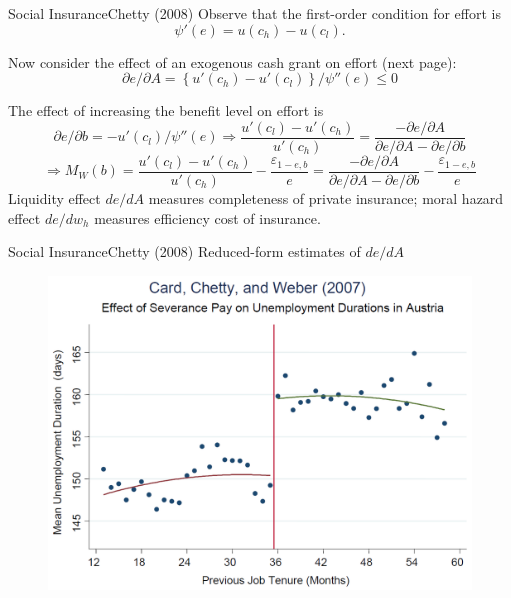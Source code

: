 \documentclass{beamer}
\begin{document}
\begin{frame}{Social Insurance}{Chetty (2008)}
	Observe that the first-order condition for effort is \hyperlink{eq26}{}
	\begin{equation}
		\psi'(e) = u(c_h) - u(c_l).
	\end{equation}

	Now consider the effect of an exogenous cash grant on effort (next page):
	\begin{equation}
		\partial e/\partial A = \left\{u'(c_h)-u'(c_l)\right\}/\psi''(e) \leq 0
	\end{equation}

	The effect of increasing the benefit level on effort is
	\begin{equation}\nonumber
		\partial e/\partial b = -u'(c_l)/\psi''(e) \Rightarrow \frac{u'(c_l)-u'(c_h)}{u'(c_h)} = \frac{-\partial e/\partial A}{\partial e/\partial A-\partial e/\partial b}
	\end{equation}
	\begin{equation}
		\Rightarrow M_W(b)= \frac{u'(c_l)-u'(c_h)}{u'(c_h)}- \frac{\varepsilon_{1-e,b}}{e} =\frac{-\partial e/\partial A}{\partial e/\partial A-\partial e/\partial b} - \frac{\varepsilon_{1-e,b}}{e}
	\end{equation}
	Liquidity effect $de/dA$ measures completeness of private insurance; moral hazard effect $de/dw_h$ measures efficiency cost of insurance.
\end{frame}
\begin{frame}{Social Insurance}{Chetty (2008)}
	Reduced-form estimates of $de/dA$
	\begin{figure}[h]
		\centering
		\includegraphics[scale=0.5]{card2007.png}
	\end{figure}
\end{frame}
\end{document}
